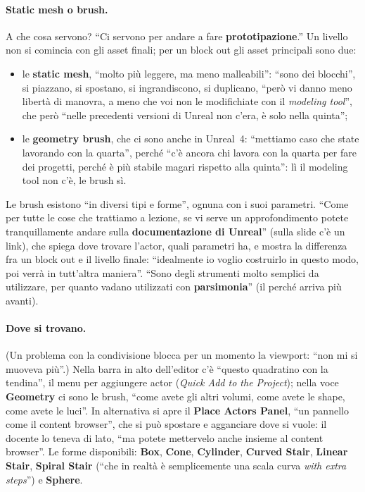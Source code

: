 \paragraph{Static mesh o brush.} A che cosa servono? ``Ci servono per andare a fare
\textbf{prototipazione}.'' Un livello non si comincia con gli asset finali; per un block out
gli asset principali sono due:
\begin{itemize}
  \item le \textbf{static mesh}, ``molto più leggere, ma meno malleabili'': ``sono dei
        blocchi'', si piazzano, si spostano, si ingrandiscono, si duplicano, ``però vi
        danno meno libertà di manovra, a meno che voi non le modifichiate con il
        \emph{modeling tool}'', che però ``nelle precedenti versioni di Unreal non c'era, è
        solo nella quinta'';
  \item le \textbf{geometry brush}, che ci sono anche in Unreal~4: ``mettiamo caso che state
        lavorando con la quarta'', perché ``c'è ancora chi lavora con la quarta per fare
        dei progetti, perché è più stabile magari rispetto alla quinta'': lì il modeling
        tool non c'è, le brush sì.
\end{itemize}
Le brush esistono ``in diversi tipi e forme'', ognuna con i suoi parametri. ``Come per tutte
le cose che trattiamo a lezione, se vi serve un approfondimento potete tranquillamente
andare sulla \textbf{documentazione di Unreal}'' (sulla slide c'è un link), che spiega dove
trovare l'actor, quali parametri ha, e mostra la differenza fra un block out e il livello
finale: ``idealmente io voglio costruirlo in questo modo, poi verrà in tutt'altra
maniera''. ``Sono degli strumenti molto semplici da utilizzare, per quanto vadano
utilizzati con \textbf{parsimonia}'' (il perché arriva più avanti).

\paragraph{Dove si trovano.} (Un problema con la condivisione blocca per un momento la
viewport: ``non mi si muoveva più''.) Nella barra in alto dell'editor c'è ``questo
quadratino con la tendina'', il menu per aggiungere actor (\emph{Quick Add to the
Project}); nella voce \textbf{Geometry} ci sono le brush, ``come avete gli altri volumi,
come avete le shape, come avete le luci''. In alternativa si apre il \textbf{Place Actors
Panel}, ``un pannello come il content browser'', che si può spostare e agganciare dove si
vuole: il docente lo teneva di lato, ``ma potete mettervelo anche insieme al content
browser''. Le forme disponibili: \textbf{Box}, \textbf{Cone}, \textbf{Cylinder},
\textbf{Curved Stair}, \textbf{Linear Stair}, \textbf{Spiral Stair} (``che in realtà è
semplicemente una scala curva \emph{with extra steps}'') e \textbf{Sphere}.

